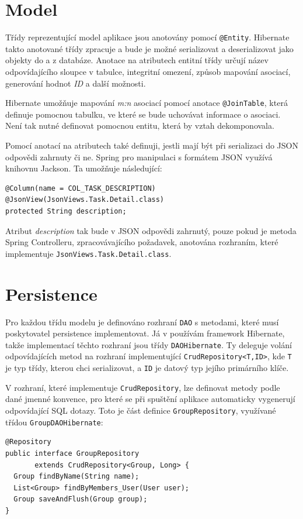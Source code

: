 \documentclass[thesis=B,czech]{FITthesis}[2012/06/26]
\begin{document}
	\section{Model}
		Třídy reprezentující model aplikace jsou anotovány pomocí \texttt{@Entity}. Hibernate takto anotované třídy zpracuje a bude je možné serializovat a deserializovat jako objekty do a z databáze. Anotace na atributech entitní třídy určují název odpovídajícího sloupce v tabulce, integritní omezení, způsob mapování asociací, generování hodnot \textit{ID} a další možnosti.
		
		Hibernate umožňuje mapování \textit{m:n} asociací pomocí anotace \texttt{@JoinTable}, která definuje pomocnou tabulku, ve které se bude uchovávat informace o asociaci. Není tak nutné definovat pomocnou entitu, která by vztah dekomponovala.
		
		Pomocí anotací na atributech také definuji, jestli mají být při serializaci do JSON odpovědi zahrnuty či ne. Spring pro manipulaci s formátem JSON využívá knihovnu Jackson. Ta umožňuje následující:
		\begin{Verbatim}
@Column(name = COL_TASK_DESCRIPTION)
@JsonView(JsonViews.Task.Detail.class)
protected String description;
		\end{Verbatim}
		Atribut \textit{description} tak bude v JSON odpovědi zahrnutý, pouze pokud je metoda Spring Controlleru, zpracovávajícího požadavek, anotována rozhraním, které implementuje \texttt{JsonViews.\allowbreak Task.\allowbreak Detail.\allowbreak class}.
	
		
		
	\section{Persistence}
		Pro každou třídu modelu je definováno rozhraní \texttt{DAO} s metodami, které musí poskytovatel persistence implementovat. Já v používám framework Hibernate, takže implementací těchto rozhraní jsou třídy \texttt{DAOHibernate}. Ty deleguje volání odpovídajících metod na rozhraní implementující \texttt{CrudRepository<T,ID>}, kde \texttt{T} je typ třídy, kterou chci serializovat, a \texttt{ID} je datový typ jejího primárního klíče.
		
		V rozhraní, které implementuje \texttt{CrudRepository}, lze definovat metody podle dané jmenné konvence, pro které se při spuštění aplikace automaticky vygenerují odpovídající SQL dotazy. Toto je část definice \texttt{GroupRepository}, využívané třídou \texttt{GroupDAOHibernate}:
		\begin{Verbatim}
@Repository
public interface GroupRepository 
       extends CrudRepository<Group, Long> {
  Group findByName(String name);
  List<Group> findByMembers_User(User user);
  Group saveAndFlush(Group group);
}
		\end{Verbatim}
		
\end{document}
